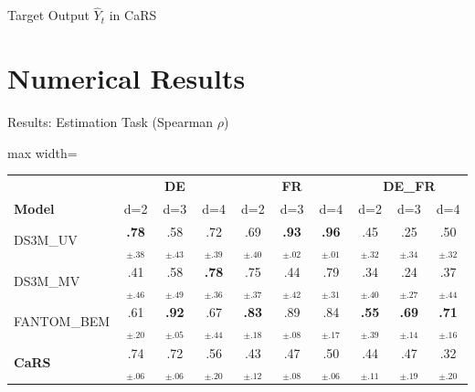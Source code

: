 \documentclass[aspectratio=169]{beamer}
\begin{document}
\begin{frame}{Target Output $\hat{Y}_t$ in CaRS}
\vspace{0.3cm}
\begin{center}
\end{center}
\end{frame}

\section{Numerical Results}

\begin{frame}{Results: Estimation Task (Spearman $\rho$)}
\begin{table}
\centering
\small
\begin{adjustbox}{max width=\textwidth}
\begin{tabular}{l|ccc|ccc|ccc}
\toprule
& \multicolumn{3}{c|}{\textbf{DE}} & \multicolumn{3}{c|}{\textbf{FR}} & \multicolumn{3}{c}{\textbf{DE\_FR}} \\
\textbf{Model} & d=2 & d=3 & d=4 & d=2 & d=3 & d=4 & d=2 & d=3 & d=4 \\
\midrule
DS3M\_UV & \textbf{.78}$_{\pm.38}$ & .58$_{\pm.43}$ & .72$_{\pm.39}$ & .69$_{\pm.40}$ & \textbf{.93}$_{\pm.02}$ & \textbf{.96}$_{\pm.01}$ & .45$_{\pm.32}$ & .25$_{\pm.34}$ & .50$_{\pm.32}$ \\
DS3M\_MV & .41$_{\pm.46}$ & .58$_{\pm.49}$ & \textbf{.78}$_{\pm.36}$ & .75$_{\pm.37}$ & .44$_{\pm.42}$ & .79$_{\pm.31}$ & .34$_{\pm.40}$ & .24$_{\pm.27}$ & .37$_{\pm.44}$ \\
FANTOM\_BEM & .61$_{\pm.20}$ & \textbf{.92}$_{\pm.05}$ & .67$_{\pm.44}$ & \textbf{.83}$_{\pm.18}$ & .89$_{\pm.08}$ & .84$_{\pm.17}$ & \textbf{.55}$_{\pm.39}$ & \textbf{.69}$_{\pm.14}$ & \textbf{.71}$_{\pm.16}$ \\
\midrule
\textbf{CaRS} & .74$_{\pm.06}$ & .72$_{\pm.06}$ & .56$_{\pm.20}$ & .43$_{\pm.12}$ & .47$_{\pm.08}$ & .50$_{\pm.06}$ & .44$_{\pm.11}$ & .47$_{\pm.19}$ & .32$_{\pm.20}$ \\
\bottomrule
\end{tabular}
\end{adjustbox}
\end{table}



\end{frame}
\end{document}
